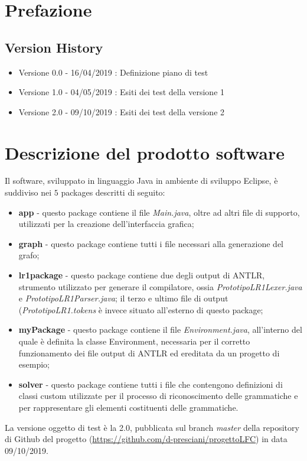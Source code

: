 \documentclass[12pt]{article}
\begin{document}
\tableofcontents

\pagebreak

\section{Prefazione}

\subsection{Version History}

\begin{itemize}
\item Versione 0.0 - 16/04/2019 : Definizione piano di test 
\item Versione 1.0 - 04/05/2019 : Esiti dei test della versione 1
\item Versione 2.0 - 09/10/2019 : Esiti dei test della versione 2
\end{itemize}

\pagebreak

\section{Descrizione del prodotto software}
Il software, sviluppato in linguaggio Java in ambiente di sviluppo Eclipse, è suddiviso nei $5$ packages descritti di seguito:
\begin{itemize}
\item \textbf{app} - questo package contiene il file \textit{Main.java}, oltre ad altri file di supporto, utilizzati per la creazione dell'interfaccia grafica;
\item \textbf{graph} - questo package contiene tutti i file necessari alla generazione del grafo;
\item \textbf{lr1package} - questo package contiene due degli output di ANTLR, strumento utilizzato per generare il compilatore, ossia \textit{PrototipoLR1Lexer.java} e \textit{PrototipoLR1Parser.java}; il terzo e ultimo file di output (\textit{PrototipoLR1.tokens} è invece situato all'esterno di questo package;
\item \textbf{myPackage} - questo package contiene il file \textit{Environment.java}, all'interno del quale è definita la classe Environment, necessaria per il corretto funzionamento dei file output di ANTLR ed ereditata da un progetto di esempio;
\item \textbf{solver} - questo package contiene tutti i file che contengono definizioni di classi custom utilizzate per il processo di riconoscimento delle grammatiche e per rappresentare gli elementi costituenti delle grammatiche.
\end{itemize}
La versione oggetto di test è la 2.0, pubblicata sul branch \textit{master} della repository di Github del progetto (\url{https://github.com/d-presciani/progettoLFC}) in data 09/10/2019.
\pagebreak
\end{document}
